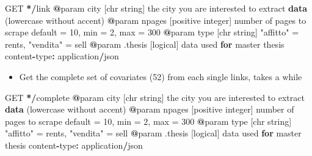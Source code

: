 \documentclass[
  12pt,
  a4paper,
  oneside]{book}
\newenvironment{Shaded}{\begin{snugshade}}{\end{snugshade}}
\newcommand{\ControlFlowTok}[1]{\textcolor[rgb]{0.13,0.29,0.53}{\textbf{#1}}}
\newcommand{\DecValTok}[1]{\textcolor[rgb]{0.00,0.00,0.81}{#1}}
\newcommand{\ErrorTok}[1]{\textcolor[rgb]{0.64,0.00,0.00}{\textbf{#1}}}
\newcommand{\KeywordTok}[1]{\textcolor[rgb]{0.13,0.29,0.53}{\textbf{#1}}}
\newcommand{\NormalTok}[1]{#1}
\newcommand{\OperatorTok}[1]{\textcolor[rgb]{0.81,0.36,0.00}{\textbf{#1}}}
\newcommand{\StringTok}[1]{\textcolor[rgb]{0.31,0.60,0.02}{#1}}
\providecommand{\tightlist}{%
  \setlength{\itemsep}{0pt}\setlength{\parskip}{0pt}}
\begin{document}
\begin{Shaded}
\begin{Highlighting}[]
\NormalTok{      GET }\OperatorTok{*}\ErrorTok{/}\NormalTok{link}
      \OperatorTok{@}\NormalTok{param city [chr string] the city you are interested to extract }\KeywordTok{data}\NormalTok{ (lowercase without accent)}
      \OperatorTok{@}\NormalTok{param npages [positive integer] number of pages to scrape default =}\StringTok{ }\DecValTok{10}\NormalTok{, min  =}\StringTok{ }\DecValTok{2}\NormalTok{, max =}\StringTok{ }\DecValTok{300}
      \OperatorTok{@}\NormalTok{param type [chr string] }\StringTok{"affitto"}\NormalTok{ =}\StringTok{ }\NormalTok{rents, }\StringTok{"vendita"}\NormalTok{  =}\StringTok{ }\NormalTok{sell }
      \OperatorTok{@}\NormalTok{param .thesis [logical] data used }\ControlFlowTok{for}\NormalTok{ master thesis}
\NormalTok{      content}\OperatorTok{-}\NormalTok{type}\OperatorTok{:}\StringTok{ }\NormalTok{application}\OperatorTok{/}\NormalTok{json }
\end{Highlighting}
\end{Shaded}

\begin{itemize}
\tightlist
\item
  Get the complete set of covariates (52) from each single links, takes a while
\end{itemize}

\begin{Shaded}
\begin{Highlighting}[]
\NormalTok{      GET }\OperatorTok{*}\ErrorTok{/}\NormalTok{complete}
      \OperatorTok{@}\NormalTok{param city [chr string] the city you are interested to extract }\KeywordTok{data}\NormalTok{ (lowercase without accent)}
      \OperatorTok{@}\NormalTok{param npages [positive integer] number of pages to scrape default =}\StringTok{ }\DecValTok{10}\NormalTok{, min  =}\StringTok{ }\DecValTok{2}\NormalTok{, max =}\StringTok{ }\DecValTok{300}
      \OperatorTok{@}\NormalTok{param type [chr string] }\StringTok{"affitto"}\NormalTok{ =}\StringTok{ }\NormalTok{rents, }\StringTok{"vendita"}\NormalTok{  =}\StringTok{ }\NormalTok{sell }
      \OperatorTok{@}\NormalTok{param .thesis [logical] data used }\ControlFlowTok{for}\NormalTok{ master thesis}
\NormalTok{      content}\OperatorTok{-}\NormalTok{type}\OperatorTok{:}\StringTok{ }\NormalTok{application}\OperatorTok{/}\NormalTok{json}
\end{Highlighting}
\end{Shaded}
\end{document}
